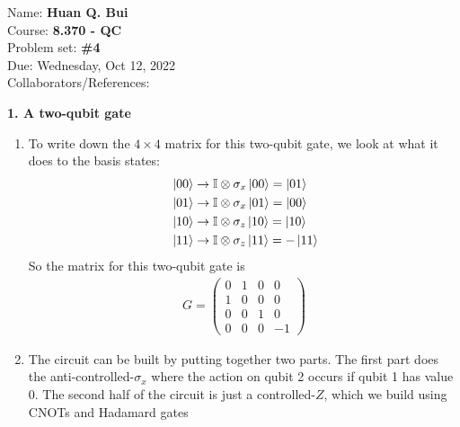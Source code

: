 \documentclass{article}
\theoremstyle{definition}
\begin{document}
\begin{framed}
\noindent Name: \textbf{Huan Q. Bui}\\
Course: \textbf{8.370 - QC}\\
Problem set: \textbf{\#4}\\
Due: Wednesday, Oct 12, 2022\\
Collaborators/References: 
\end{framed}



\noindent \textbf{1. A two-qubit gate} 

\begin{enumerate}[label=(\alph*)]
	\item To write down the $4\times 4$ matrix for this two-qubit gate, we look at what it does to the basis states:
	\begin{align*}
		&\ket{00} \to \mathbb{I} \otimes \sigma_x \ket{00} = \ket{01}\\
		&\ket{01} \to \mathbb{I} \otimes \sigma_x \ket{01} = \ket{00}\\
		&\ket{10} \to \mathbb{I} \otimes \sigma_z \ket{10} = \ket{10}\\
		&\ket{11} \to \mathbb{I} \otimes \sigma_z \ket{11} = -\ket{11}
	\end{align*}
	So the matrix for this two-qubit gate is 
	\begin{align*}
		G = \begin{pmatrix}
			0 & 1 & 0 & 0\\
			1 & 0 & 0 & 0\\
			0 & 0 & 1 & 0\\
			0 & 0 & 0 & -1
		\end{pmatrix}
	\end{align*}


	\item The circuit can be built by putting together two parts. The first part does the anti-controlled-$\sigma_x$ where the action on qubit 2 occurs if qubit 1 has value 0. The second half of the circuit is just a controlled-$Z$, which we build using CNOTs and Hadamard gates\\
	

\end{enumerate}
\end{document}
